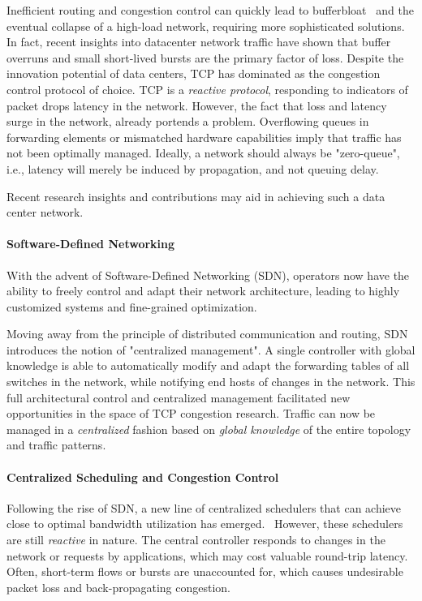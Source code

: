 Inefficient routing and congestion control can quickly lead to 
bufferbloat~\cite{bufferbloat} and the eventual collapse of a high-load 
network, requiring more sophisticated solutions. In fact, recent insights into 
datacenter network traffic have shown that buffer overruns and small 
short-lived bursts are the primary factor of loss.\cite{fb_dc,msr_dc}
Despite the innovation potential of data centers, TCP has dominated as 
the congestion control protocol of choice.
TCP is a \textit{reactive protocol}, responding to indicators of packet drops
latency in the network. However, the fact that loss and latency 
surge in the network, already portends a problem. Overflowing queues in 
forwarding elements or mismatched hardware capabilities imply that traffic has 
not been optimally managed.
Ideally, a network should always be "zero-queue", i.e., latency 
will merely be induced by propagation, and not queuing delay.

Recent research insights and contributions may aid in achieving such a data 
center network.


\paragraph{Software-Defined Networking}
With the advent of Software-Defined Networking (SDN), operators now have the 
ability to freely control and adapt their network architecture, leading to 
highly customized systems and fine-grained optimization.~\cite{sdn_road}

Moving away from the principle of distributed communication and routing, SDN 
introduces the notion of "centralized management". A single controller with 
global knowledge is able to automatically modify and adapt the forwarding 
tables of all switches in the network, while notifying end hosts of changes in 
the network.
This full architectural control and centralized management facilitated new 
opportunities in the space of TCP congestion research. Traffic can now be 
managed in a  \textit{centralized} fashion based on \textit{global knowledge} 
of the entire topology and traffic patterns.

\paragraph{Centralized Scheduling and Congestion Control}
Following the rise of SDN, a new line of centralized schedulers that can 
achieve close to optimal bandwidth utilization has emerged.~\cite{hedera, 
fastpass, microte, b4, dionysus}
However, these schedulers are still \textit{reactive} in nature. The central 
controller responds to changes in the network or requests by applications, 
which may cost valuable round-trip latency. Often, short-term flows or bursts 
are unaccounted for, which causes undesirable packet loss and back-propagating 
congestion.\cite{perc}

